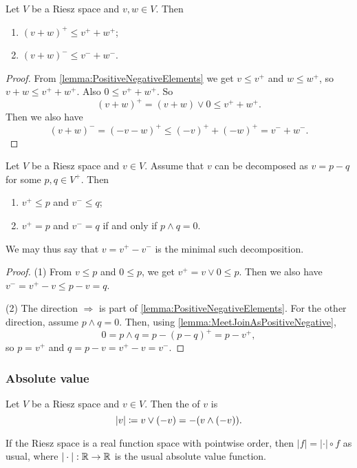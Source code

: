 \begin{proposition} \label{prop:triangleInequalityPositiveNegativeElements}
Let $V$ be a Riesz space and $v,w\in V$. Then
\begin{enumerate}
\item $(v+w)^+ \leq v^+ + w^+$;
\item $(v+w)^- \leq v^- + w^-$.
\end{enumerate}
\end{proposition}
\begin{proof}
From \ref{lemma:PositiveNegativeElements} we get $v \leq v^+$ and $w\leq w^+$, so $v+w \leq v^+ + w^+$. Also $0 \leq v^+ + w^+$. So
\[ (v+w)^+ = (v+w)\vee 0 \leq v^+ + w^+. \]
Then we also have
\[ (v+w)^- = (-v-w)^+ \leq (-v)^+ + (-w)^+ = v^- + w^-. \]
\end{proof}

\begin{proposition} \label{prop:minimalPositiveDecomposition}
Let $V$ be a Riesz space and $v\in V$. Assume that $v$ can be decomposed as $v = p-q$ for some $p,q\in V^+$. Then
\begin{enumerate}
\item $v^+ \leq p$ and $v^- \leq q$;
\item $v^+ = p$ and $v^- = q$ \textup{if and only if} $p\wedge q = 0$.
\end{enumerate}
\end{proposition}
We may thus say that $v = v^+ - v^-$ is the minimal such decomposition.
\begin{proof}
(1) From $v\leq p$ and $0\leq p$, we get $v^+ = v \vee 0 \leq p$. Then we also have $v^- = v^+ - v \leq p - v = q$.

(2) The direction $\Rightarrow$ is part of \ref{lemma:PositiveNegativeElements}. For the other direction, assume $p\wedge q = 0$. Then, using \ref{lemma:MeetJoinAsPositiveNegative},
\[ 0 = p\wedge q = p - (p-q)^+ = p - v^+, \]
so $p = v^+$ and $q = p - v = v^+ - v = v^-$.
\end{proof}

\subsubsection{Absolute value}
\begin{definition}
Let $V$ be a Riesz space and $v\in V$. Then the  of $v$ is
\[ |v| \coloneqq v\vee (-v) = -(v\wedge (-v)). \]
\end{definition}

If the Riesz space is a real function space with pointwise order, then $|f| = |\cdot|\circ f$ as usual, where $|\cdot|: \mathbb{R}\to \mathbb{R}$ is the usual absolute value function.

